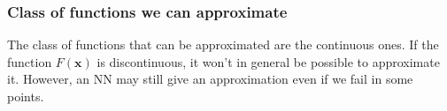 \documentclass{beamer}
\begin{document}
\begin{frame}
\frametitle{Class of functions we can approximate}

\begin{block}{}
The class of functions that can be approximated are the continuous ones.
If the function $F(\bm{x})$ is discontinuous, it won't in general be possible to approximate it. However, an NN may still give an approximation even if we fail in some points.
\end{block}
\end{frame}
\end{document}
